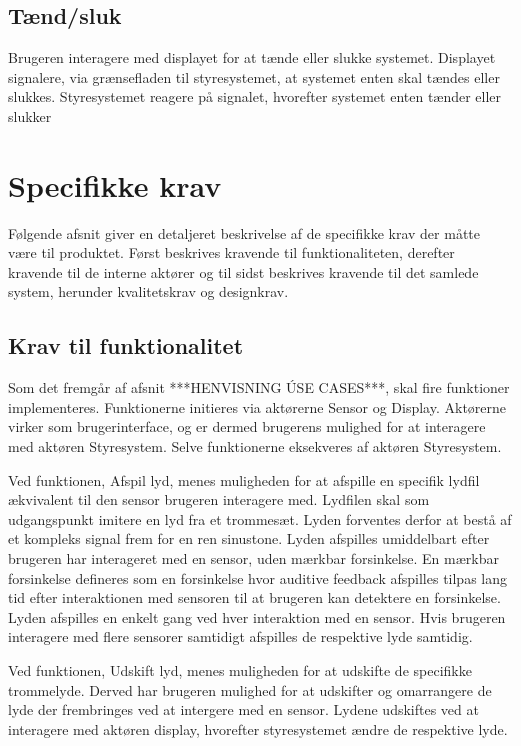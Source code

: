 \subsection{Tænd/sluk}
Brugeren interagere med displayet for at tænde eller slukke systemet. Displayet signalere, via grænsefladen til styresystemet, at systemet enten skal tændes eller slukkes. Styresystemet reagere på signalet, hvorefter systemet enten tænder eller slukker

\section{Specifikke krav}
Følgende afsnit giver en detaljeret beskrivelse af de specifikke krav der måtte være til produktet. Først beskrives kravende til funktionaliteten, derefter kravende til de interne aktører og til sidst beskrives kravende til det samlede system, herunder kvalitetskrav og designkrav. 

\subsection{Krav til funktionalitet}
Som det fremgår af afsnit ***HENVISNING ÚSE CASES***, skal fire funktioner implementeres. Funktionerne initieres via aktørerne Sensor og Display. Aktørerne virker som brugerinterface, og er dermed brugerens mulighed for at interagere med aktøren Styresystem. Selve funktionerne eksekveres af aktøren Styresystem.

Ved funktionen, Afspil lyd, menes muligheden for at afspille en specifik lydfil ækvivalent til den sensor brugeren interagere med. Lydfilen skal som udgangspunkt imitere en lyd fra et trommesæt. Lyden forventes derfor at bestå af et kompleks signal frem for en ren sinustone. Lyden afspilles umiddelbart efter brugeren har interageret med en sensor, uden mærkbar forsinkelse. En mærkbar forsinkelse defineres som en forsinkelse hvor auditive feedback afspilles tilpas lang tid efter interaktionen med sensoren til at brugeren kan detektere en forsinkelse. Lyden afspilles en enkelt gang ved hver interaktion med en sensor. Hvis brugeren interagere med flere sensorer samtidigt afspilles de respektive lyde samtidig.  

Ved funktionen, Udskift lyd, menes muligheden for at udskifte de specifikke trommelyde. Derved har brugeren mulighed for at udskifter og omarrangere de lyde der frembringes ved at intergere med en sensor. Lydene udskiftes ved at interagere med aktøren display, hvorefter styresystemet ændre de respektive lyde. 

